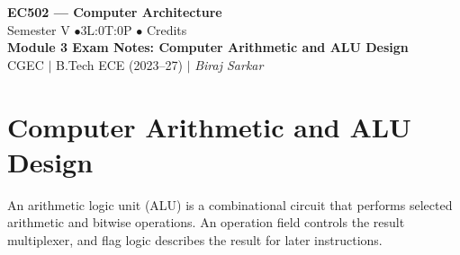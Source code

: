 \documentclass[12pt,a4paper]{article}
\begin{document}

\begin{center}
  {\LARGE\bfseries\color{myred} EC502 --- Computer Architecture}\\[5pt]
  {\normalsize\color{mydark} Semester V \quad$\bullet$\quad 3L:0T:0P \quad$\bullet$ Credits}\\[3pt]
  {\normalsize\color{myteal}\textbf{Module 3 Exam Notes: Computer Arithmetic and ALU Design}}\\[3pt]
  {\small\color{mydark} CGEC \;$|$\; B.Tech ECE (2023--27) \;$|$\; \textit{Biraj Sarkar}}
\end{center}
\vspace{2pt}
\noindent{\color{myred}\rule{\linewidth}{1.5pt}}
\vspace{2pt}

\hypersetup{linkcolor=mydark}
\tableofcontents
\hypersetup{linkcolor=myteal}
\newpage

\section{Computer Arithmetic and ALU Design}
\begin{tcolorbox}[defbox,title={Arithmetic logic unit}]
An arithmetic logic unit (ALU) is a combinational circuit that performs selected arithmetic and bitwise operations. An operation field controls the result multiplexer, and flag logic describes the result for later instructions.
\end{tcolorbox}
\end{document}
